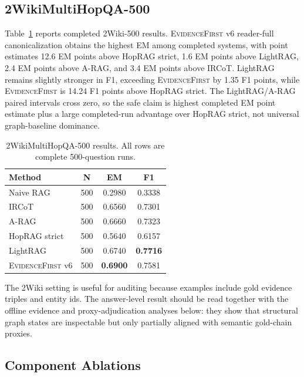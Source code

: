 \documentclass[runningheads]{llncs}
\newcommand{\sys}{\textsc{EvidenceFirst}\xspace}
\begin{document}
\subsection{2WikiMultiHopQA-500}

Table~\ref{tab:2wiki_main} reports completed 2Wiki-500 results. \sys v6
reader-full canonicalization obtains the highest EM among completed systems,
with point estimates 12.6 EM points above HopRAG strict, 1.6 EM points above
LightRAG, 2.4 EM points above A-RAG, and 3.4 EM points above IRCoT. LightRAG
remains slightly stronger in F1, exceeding \sys by 1.35 F1 points, while \sys is
14.24 F1 points above HopRAG strict. The LightRAG/A-RAG paired intervals cross
zero, so the safe claim is highest completed EM point estimate plus a large
completed-run advantage over HopRAG strict, not universal graph-baseline
dominance.

\begin{table}[t]
\centering
\caption{2WikiMultiHopQA-500 results. All rows are complete 500-question runs.}
\label{tab:2wiki_main}
\small
\begin{tabular}{lccc}
\toprule
Method & N & EM & F1 \\
\midrule
Naive RAG & 500 & 0.2980 & 0.3338 \\
IRCoT & 500 & 0.6560 & 0.7301 \\
A-RAG & 500 & 0.6660 & 0.7323 \\
HopRAG strict & 500 & 0.5640 & 0.6157 \\
LightRAG & 500 & 0.6740 & \textbf{0.7716} \\
\midrule
\sys v6 & 500 & \textbf{0.6900} & 0.7581 \\
\bottomrule
\end{tabular}
\end{table}

The 2Wiki setting is useful for auditing because examples include gold evidence
triples and entity ids. The answer-level result should be read together with the
offline evidence and proxy-adjudication analyses below: they show that
structural graph states are inspectable but only partially aligned with semantic
gold-chain proxies.

\subsection{Component Ablations}
\label{sec:ablations}
\end{document}
